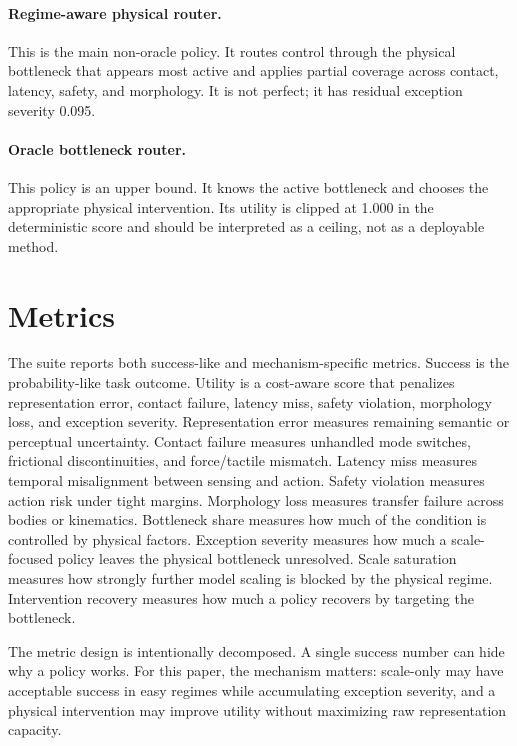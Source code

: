 \documentclass{article}
\begin{document}
\paragraph{Regime-aware physical router.}
This is the main non-oracle policy. It routes control through the physical bottleneck that appears most active and applies partial coverage across contact, latency, safety, and morphology. It is not perfect; it has residual exception severity 0.095.

\paragraph{Oracle bottleneck router.}
This policy is an upper bound. It knows the active bottleneck and chooses the appropriate physical intervention. Its utility is clipped at 1.000 in the deterministic score and should be interpreted as a ceiling, not as a deployable method.

\section{Metrics}

The suite reports both success-like and mechanism-specific metrics. Success is the probability-like task outcome. Utility is a cost-aware score that penalizes representation error, contact failure, latency miss, safety violation, morphology loss, and exception severity. Representation error measures remaining semantic or perceptual uncertainty. Contact failure measures unhandled mode switches, frictional discontinuities, and force/tactile mismatch. Latency miss measures temporal misalignment between sensing and action. Safety violation measures action risk under tight margins. Morphology loss measures transfer failure across bodies or kinematics. Bottleneck share measures how much of the condition is controlled by physical factors. Exception severity measures how much a scale-focused policy leaves the physical bottleneck unresolved. Scale saturation measures how strongly further model scaling is blocked by the physical regime. Intervention recovery measures how much a policy recovers by targeting the bottleneck.

The metric design is intentionally decomposed. A single success number can hide why a policy works. For this paper, the mechanism matters: scale-only may have acceptable success in easy regimes while accumulating exception severity, and a physical intervention may improve utility without maximizing raw representation capacity.
\end{document}
